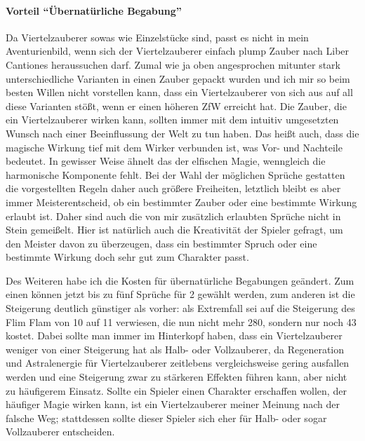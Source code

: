 \paragraph{Vorteil \enquote{Übernatürliche Begabung}}
Da Viertelzauberer sowas wie Einzelstücke sind, passt es nicht in mein Aventurienbild, wenn sich der Viertelzauberer einfach plump Zauber nach Liber Cantiones heraussuchen darf. Zumal wie ja oben angesprochen mitunter stark unterschiedliche Varianten in einen Zauber gepackt wurden und ich mir so beim besten Willen nicht vorstellen kann, dass ein Viertelzauberer von sich aus auf all diese Varianten stößt, wenn er einen höheren ZfW erreicht hat. Die Zauber, die ein Viertelzauberer wirken kann, sollten immer mit dem intuitiv umgesetzten Wunsch nach einer Beeinflussung der Welt zu tun haben. Das heißt auch, dass die magische Wirkung tief mit dem Wirker verbunden ist, was Vor- und Nachteile bedeutet. In gewisser Weise ähnelt das der elfischen Magie, wenngleich die harmonische Komponente fehlt. Bei der Wahl der möglichen Sprüche gestatten die vorgestellten Regeln daher auch größere Freiheiten, letztlich bleibt es aber immer Meisterentscheid, ob ein bestimmter Zauber oder eine bestimmte Wirkung erlaubt ist. Daher sind auch die von mir zusätzlich erlaubten Sprüche nicht in Stein gemeißelt. Hier ist natürlich auch die Kreativität der Spieler gefragt, um den Meister davon zu überzeugen, dass ein bestimmter Spruch oder eine bestimmte Wirkung doch sehr gut zum Charakter passt.

Des Weiteren habe ich die Kosten für übernatürliche Begabungen geändert. Zum einen können jetzt bis zu fünf Sprüche für \SI{2}{\GP} gewählt werden, zum anderen ist die Steigerung deutlich günstiger als vorher: als Extremfall sei auf die Steigerung des Flim Flam von 10 auf 11 verwiesen, die nun nicht mehr \SI{280}{\AP}, sondern nur noch \SI{43}{\AP} kostet. Dabei sollte man immer im Hinterkopf haben, dass ein Viertelzauberer weniger von einer Steigerung hat als Halb- oder Vollzauberer, da Regeneration und Astralenergie für Viertelzauberer zeitlebens vergleichsweise gering ausfallen werden und eine Steigerung zwar zu stärkeren Effekten führen kann, aber nicht zu häufigerem Einsatz. Sollte ein Spieler einen Charakter erschaffen wollen, der häufiger Magie wirken kann, ist ein Viertelzauberer meiner Meinung nach der falsche Weg; stattdessen sollte dieser Spieler sich eher für Halb- oder sogar Vollzauberer entscheiden.

